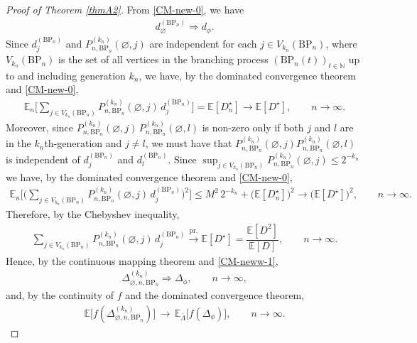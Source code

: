 \documentclass[11pt]{article}
\numberwithin{equation}{section}
\theoremstyle{plain}
\newcommand{\N}{\mathbb N}
\newcommand{\prob}{\overset{\mathrm{pr.}}{\longrightarrow}}
\newcommand{\weak}{\Longrightarrow}
\newcommand{\E}{\mathbb E}
\begin{document}
\begin{proof}[Proof of Theorem \ref{thmA2}]
From \eqref{CM-new-0}, we have
\begin{align}
\label{CM-neww-1}
d_{\varnothing}^{(\mathrm{BP}_{n})}\weak d_{\phi}.
\end{align}
 Since $d_{j}^{(\mathrm{BP}_{n})}$ and $P_{n,\mathrm{BP}_{n}}^{(k_n)}(\varnothing, j)$ are independent for each $j\in V_{k_n}(\mathrm{BP}_{n})$, where $V_{k_n}(\mathrm{BP}_{n})$ is the set of all vertices in the branching process $(\mathrm{BP}_{n}(t))_{t\in\N}$ up to and including generation $k_n$, we have, by the dominated convergence theorem and \eqref{CM-new-0},
\begin{align*}
\E_n\bigg[\sum_{j\in V_{k_n}(\mathrm{BP}_{n})} P_{n,\mathrm{BP}_{n}}^{(k_n)}(\varnothing, j)\, 
d^{(\mathrm{BP}_{n})}_{j}\bigg] = \E[D_{n}^{\star}]\to \E[D^{\star}],\qquad n\to\infty .
\end{align*}
Moreover, since $P_{n,\mathrm{BP}_{n}}^{(k_n)}(\varnothing, j)\,P_{n,\mathrm{BP}_{n}}^{(k_n)}(\varnothing, l)$ is non-zero only if both $j$ and $l$ are in the $k_n$th-generation and $j \neq l$, we must have that $P_{n,\mathrm{BP}_{n}}^{(k_n)}(\varnothing, j)P_{n,\mathrm{BP}_{n}}^{(k_n)}(\varnothing, l)$ is independent of $d^{(\mathrm{BP}_{n})}_{j}$ and $d^{(\mathrm{BP}_{n})}_{l}$. Since $\sup_{j\in V_{k_n}(\mathrm{BP}_{n})}P_{n,\mathrm{BP}_{n}}^{(k_n)}(\varnothing, j)\leq 2^{-k_n}$ we have, by the dominated convergence theorem and \eqref{CM-new-0},
\begin{align*}
\E_n\bigg[\Big(\sum_{j\in V_{k_n}(\mathrm{BP}_{n})} P_{n,\mathrm{BP}_{n}}^{(k_n)}(\varnothing, j)\, 
d^{(\mathrm{BP}_{n})}_{j}\Big)^2\bigg]
\leq M^2 \, 2^{-k_n}+\big(\E[D_{n}^{\star}]\big)^2 \to \big(\E[D^{\star}]\big)^2,\qquad n\to \infty.
\end{align*}
Therefore, by the Chebyshev inequality,
\begin{align*}
\sum_{j\in V_{k_n}(\mathrm{BP}_{n})} P_{n,\mathrm{BP}_{n}}^{(k_n)}(\varnothing, j)\, 
d^{(\mathrm{BP}_{n})}_{j}\prob \E[D^{\star}]=\dfrac{\E[D^2]}{\E[D]},\qquad n\to\infty.
\end{align*}
Hence, by the continuous mapping theorem and \eqref{CM-neww-1},
\begin{align*}
\Delta_{\varnothing ,n,\mathrm{BP}_{n}}^{(k_n)}\weak \Delta_{\phi},\qquad n\to\infty,
\end{align*}
and, by the continuity of $f$ and the dominated convergence theorem,
\begin{align}
\label{CM-newww}
\E\big[f(\Delta_{\varnothing ,n,\mathrm{BP}_{n}}^{(k_n)})\big]
\,\to\, 
\E_{\bar{\Lambda}}\big[f(\Delta_{\phi})\big],\qquad n\to\infty.

\end{align}
\end{proof}
\end{document}
